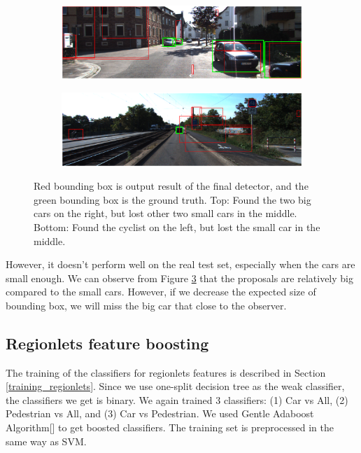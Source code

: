 \documentclass{article} %
\begin{document}
\begin{figure}[htb]
\begin{subfigure}
    \centering
    \includegraphics[width=.9\linewidth]{toosmall1.eps}
    \label{fig:toosmall1}
\end{subfigure}
\begin{subfigure}
    \centering
    \includegraphics[width=.9\linewidth]{toosmall2.eps}
    \label{fig:toosmall2}
\end{subfigure}
\caption{Red bounding box is output result of the final detector, and the green bounding box is the ground truth. Top: Found the two big cars on the right, but lost other two small cars in the middle. Bottom: Found the cyclist on the left, but lost the small car in the middle.
\label{fig:toosmall}}
\end{figure}


However, it doesn't perform well on the real test set, especially when the cars are small enough. We can observe from Figure \ref{fig:toosmall} that the proposals are relatively big compared to the small cars. However, if we decrease the expected size of bounding box, we will miss the big car that close to the observer. 

\subsection{Regionlets feature boosting}

The training of the classifiers for regionlets features is described in Section \ref{training_regionlets}. Since we use one-split decision tree as the weak classifier, the classifiers we get is binary. We again trained 3 classifiers: (1) Car vs All, (2) Pedestrian vs All, and (3) Car vs Pedestrian. We used Gentle Adaboost Algorithm[] to get boosted classifiers. The training set is preprocessed in the same way as SVM. 
\end{document}
